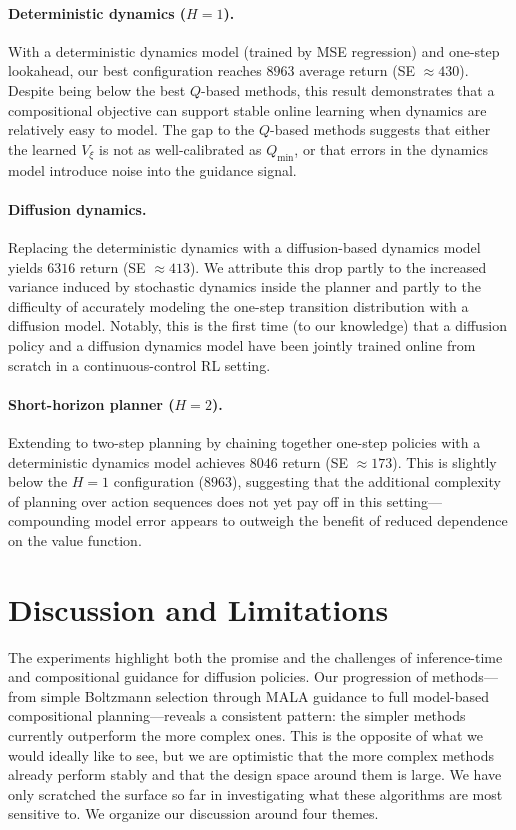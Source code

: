 \documentclass{article}
\theoremstyle{plain}
\theoremstyle{definition}
\theoremstyle{remark}
\begin{document}
\paragraph{Deterministic dynamics ($H=1$).}
With a deterministic dynamics model (trained by MSE regression) and one-step lookahead, our best configuration reaches $8963$ average return (SE $\approx 430$).
Despite being below the best $Q$-based methods, this result demonstrates that a compositional objective can support stable online learning when dynamics are relatively easy to model.
The gap to the $Q$-based methods suggests that either the learned $V_\xi$ is not as well-calibrated as $Q_{\min}$, or that errors in the dynamics model introduce noise into the guidance signal.

\paragraph{Diffusion dynamics.}
Replacing the deterministic dynamics with a diffusion-based dynamics model yields $6316$ return (SE $\approx 413$).
We attribute this drop partly to the increased variance induced by stochastic dynamics inside the planner and partly to the difficulty of accurately modeling the one-step transition distribution with a diffusion model.
Notably, this is the first time (to our knowledge) that a diffusion policy and a diffusion dynamics model have been jointly trained online from scratch in a continuous-control RL setting.

\paragraph{Short-horizon planner ($H=2$).}
Extending to two-step planning by chaining together one-step policies with a deterministic dynamics model achieves $8046$ return (SE $\approx 173$).
This is slightly below the $H=1$ configuration ($8963$), suggesting that the additional complexity of planning over action sequences does not yet pay off in this setting---compounding model error appears to outweigh the benefit of reduced dependence on the value function.


\section{Discussion and Limitations}
\label{sec:discussion}

The experiments highlight both the promise and the challenges of inference-time and compositional guidance for diffusion policies.
Our progression of methods---from simple Boltzmann selection through MALA guidance to full model-based compositional planning---reveals a consistent pattern: the simpler methods currently outperform the more complex ones.
This is the opposite of what we would ideally like to see, but we are optimistic that the more complex methods already perform stably and that the design space around them is large. We have only scratched the surface so far in investigating what these algorithms are most sensitive to.
We organize our discussion around four themes.
\end{document}
